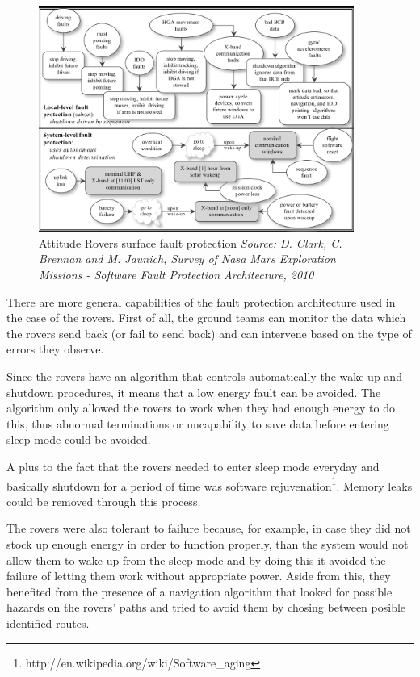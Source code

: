 \begin{figure}[htb]
	\begin{center}
	\includegraphics[width=0.92\textwidth]{img/rovers.png}
	\caption{Attitude Rovers surface fault protection\small{\textit{ Source: D.
	Clark, C. Brennan and M. Jaunich, Survey of Nasa Mars Exploration Missions -
	Software Fault Protection Architecture, 2010}}}
	\label{fig:rovers}
	\end{center}
\end{figure}

There are more general capabilities of the fault protection architecture used in
the case of the rovers. First of all, the ground teams can monitor the data
which the rovers send back (or fail to send back) and can intervene based on the
type of errors they observe.

Since the rovers have an algorithm that controls automatically the wake up and
shutdown procedures, it means that a low energy fault can be avoided. The
algorithm only allowed the rovers to work when they had enough energy to do
this, thus abnormal terminations or uncapability to save data before entering
sleep mode could be avoided. 

A plus to the fact that the rovers needed to enter sleep mode everyday and
basically shutdown for a period of time was software
rejuvenation\footnote{http://en.wikipedia.org/wiki/Software\_aging}. Memory
leaks could be removed through this process.

The rovers were also tolerant to failure because, for example, in case they did
not stock up enough energy in order to function properly, than the system would
not allow them to wake up from the sleep mode and by doing this it avoided the
failure of letting them work without appropriate power. Aside from this, they
benefited from the presence of a navigation algorithm that looked for possible
hazards on the rovers' paths and tried to avoid them by chosing between posible
identified routes.

